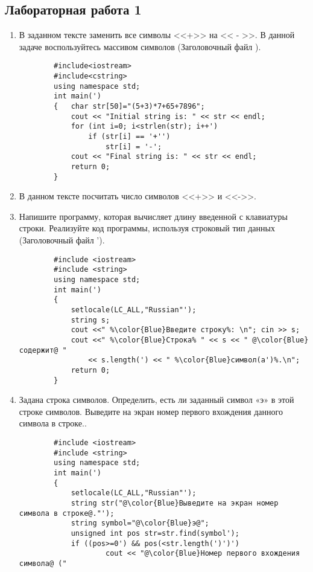 \subsection{Лабораторная работа 1}
\begin{enumerate}[leftmargin=*]
    \item В заданном тексте заменить все символы <<+>> на << - >>. В данной задаче воспользуйтесь массивом символов (Заголовочный файл ).
    \begin{lstlisting}
        #include<iostream>
        #include<cstring>
        using namespace std;
        int main(')
        {   char str[50]="(5+3)*7+65+7896";
            cout << "Initial string is: " << str << endl;
            for (int i=0; i<strlen(str); i++')
                if (str[i] == '+'')
                    str[i] = '-';
            cout << "Final string is: " << str << endl;
            return 0;
        }
    \end{lstlisting}
    \item В данном тексте посчитать число символов <<+>> и <<->>.
    \item Напишите программу, которая вычисляет длину введенной с клавиатуры строки. Реализуйте код программы, используя строковый тип данных (Заголовочный файл ').
    \begin{lstlisting}
        #include <iostream>
        #include <string>
        using namespace std;
        int main(')
        {
            setlocale(LC_ALL,"Russian"');
            string s;
            cout <<" %\color{Blue}Введите строку%: \n"; cin >> s;
            cout <<" %\color{Blue}Строка% " << s << " @\color{Blue}содержит@ "
                << s.length(') << " %\color{Blue}символ(а')%.\n";
            return 0;
        }
    \end{lstlisting}
    \item Задана строка символов. Определить, есть ли заданный символ «э» в этой строке символов. Выведите на экран номер первого вхождения данного символа в строке..
    \begin{lstlisting}
        #include <iostream>
        #include <string>
        using namespace std;
        int main(')
        {
            setlocale(LC_ALL,"Russian"');
            string str("@\color{Blue}Выведите на экран номер символа в строке@."');
            string symbol="@\color{Blue}э@";
            unsigned int pos str=str.find(symbol');
            if ((pos>=0') && pos(<str.length(')')')
                    cout << "@\color{Blue}Номер первого вхождения символа@ ("

\end{lstlisting}
\end{enumerate}
